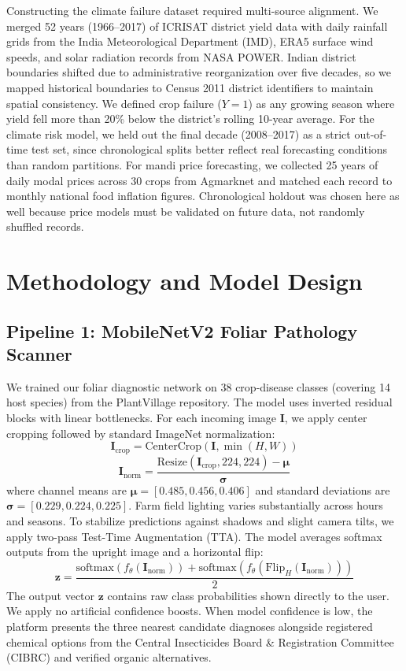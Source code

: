 \documentclass[conference]{IEEEtran}
\begin{document}
Constructing the climate failure dataset required multi-source alignment. We merged 52 years (1966--2017) of ICRISAT district yield data with daily rainfall grids from the India Meteorological Department (IMD), ERA5 surface wind speeds, and solar radiation records from NASA POWER. Indian district boundaries shifted due to administrative reorganization over five decades, so we mapped historical boundaries to Census 2011 district identifiers to maintain spatial consistency. We defined crop failure ($Y=1$) as any growing season where yield fell more than 20\% below the district's rolling 10-year average. For the climate risk model, we held out the final decade (2008--2017) as a strict out-of-time test set, since chronological splits better reflect real forecasting conditions than random partitions. For mandi price forecasting, we collected 25 years of daily modal prices across 30 crops from Agmarknet and matched each record to monthly national food inflation figures. Chronological holdout was chosen here as well because price models must be validated on future data, not randomly shuffled records.

\section{Methodology and Model Design}

\subsection{Pipeline 1: MobileNetV2 Foliar Pathology Scanner}
We trained our foliar diagnostic network on 38 crop-disease classes (covering 14 host species) from the PlantVillage repository. The model uses inverted residual blocks with linear bottlenecks. For each incoming image $\mathbf{I}$, we apply center cropping followed by standard ImageNet normalization:
\begin{equation}
\mathbf{I}_{\text{crop}} = \text{CenterCrop}(\mathbf{I}, \min(H, W))
\end{equation}
\begin{equation}
\mathbf{I}_{\text{norm}} = \frac{\text{Resize}(\mathbf{I}_{\text{crop}}, 224, 224) - \boldsymbol{\mu}}{\boldsymbol{\sigma}}
\end{equation}
where channel means are $\boldsymbol{\mu} = [0.485, 0.456, 0.406]$ and standard deviations are $\boldsymbol{\sigma} = [0.229, 0.224, 0.225]$. Farm field lighting varies substantially across hours and seasons. To stabilize predictions against shadows and slight camera tilts, we apply two-pass Test-Time Augmentation (TTA). The model averages softmax outputs from the upright image and a horizontal flip:
\begin{equation}
\mathbf{z} = \frac{\text{softmax}(f_\theta(\mathbf{I}_{\text{norm}})) + \text{softmax}(f_\theta(\text{Flip}_H(\mathbf{I}_{\text{norm}})))}{2}
\end{equation}
The output vector $\mathbf{z}$ contains raw class probabilities shown directly to the user. We apply no artificial confidence boosts. When model confidence is low, the platform presents the three nearest candidate diagnoses alongside registered chemical options from the Central Insecticides Board \& Registration Committee (CIBRC) and verified organic alternatives.
\end{document}
